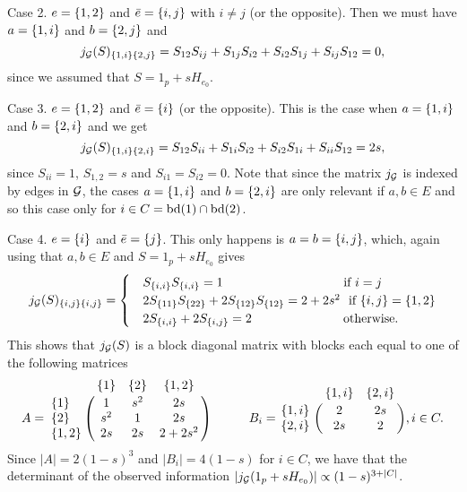 Case 2. $e = {\left\{1, 2\right\}}$ and $\bar e = {\left\{i, j\right\}}$ with $i \neq j$ (or the opposite). Then we must have $a = {\left\{1, i\right\}}$ and $b = {\left\{2, j\right\}}$ and
\begin{equation*}
    j_{\mathcal{G}}(S)_{{\left\{1, i\right\}} {\left\{2, j\right\}}} = S_{1 2}S_{i j} + S_{1 j} S_{i 2} + S_{i 2} S_{1 j} + S_{i j} S_{1 2} = 0,
\end{equation*}
since we assumed that $S = 1_p + s H_{e_0}$.

Case 3. $e = {\left\{1, 2\right\}}$ and $\bar e = {\left\{i\right\}}$ (or the opposite). This is the case when $a = {\left\{1, i\right\}}$ and $b = {\left\{2, i\right\}}$ and we get
\begin{equation*}
    j_{\mathcal{G}}(S)_{{\left\{1, i\right\}} {\left\{2, i\right\}}} = 
    S_{1 2}S_{i i} + S_{1 i} S_{i 2} + S_{i 2} S_{1 i} + S_{i i} S_{1 2} = 2 s,
\end{equation*}
since $S_{i i} = 1$, $S_{1, 2} = s$ and $S_{i 1} = S_{i 2} = 0$. Note that since the matrix $j_{\mathcal{G}}$ is indexed by edges in ${\mathcal{G}}$, the cases $a = {\left\{1, i\right\}}$ and $b = {\left\{2, i\right\}}$ are only relevant if $a, b \in E$ and so this case only for $i \in C = {\textrm{bd}}(1) \cap {\textrm{bd}}(2)$.

Case 4. $e = {\left\{i\right\}}$ and $\bar e = {\left\{j\right\}}$. This only happens is $a = b = {\left\{i, j\right\}}$, which, again using that $a, b \in E$ and $S = 1_p + sH_{e_0}$ gives
\begin{equation*}
    j_\G(S)_{\eset{i, j} \eset{i, j}} = \begin{cases}
        &S_\eset{i, i}S_\eset{i, i} = 1\ \ \ \ \ \ \ \ \ \ \ \ \ \ \ \ \ \ \ \ \ \ \ \ \ \ \ \  \t{ if } i = j\\
        &2S_\eset{1 1}S_\eset{2 2} + 2S_\eset{1 2}S_\eset{1 2} = 2 + 2s^2\  \t{ if } \eset{i, j} = \eset{1, 2}\\
        &2S_\eset{i,i} + 2S_\eset{i, j} = 2\ \ \ \ \ \ \ \ \ \ \ \ \ \ \ \ \ \ \ \ \  \t{ otherwise.}
    \end{cases}
\end{equation*}
This shows that $j_{\mathcal{G}}(S)$ is a block diagonal matrix with blocks each equal to one of the following matrices
\begin{equation*}
    A = \bordermatrix{~ & \eset{1} & \eset{2} & \eset{1, 2} \cr
        \eset{1} & 1 & s^2 & 2s \cr
        \eset{2} & s^2 & 1 & 2s \cr
        \eset{1, 2} & 2s & 2s & 2 + 2s^2 \cr
    }
    \ \ \ \ \ \ \ \ \ 
    B_i = \bordermatrix{~ & \eset{1, i} & \eset{2, i} \cr
        \eset{1, i} & 2 & 2s \cr
        \eset{2, i} & 2s & 2 \cr
    }, i \in C.
\end{equation*}
Since $|A| = 2 (1-s)^3$ and $|B_i| = 4(1-s)$ for $i \in C$, we have that the determinant of the observed information $\left|j_{\mathcal{G}}(1_p + sH_{e_0})\right| \propto (1-s)^{3 + |C|}$.